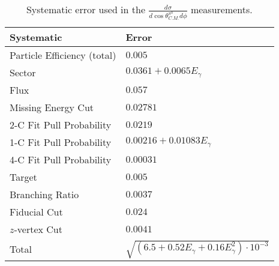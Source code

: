 \begin{table}[h!]
\begin{center}


\caption[Systematics]{\label{tab:systematics}Systematic error used in the $\frac{d\sigma}{d\cos\theta^{\pi^0}_{C.M.} d\phi}$ measurements. \vspace{0.75mm}}

\begin{tabular}{p{5.25cm} | p{5.35cm}}
\hline
Systematic & Error \\
\hline
Particle Efficiency (total) & $0.005$ \\
Sector  & $ 0.0361 + 0.0065E_{\gamma}$ \\
Flux  & $ 0.057$ \\
Missing Energy Cut  & $0.02781$ \\
2-C Fit Pull Probability & $0.0219$ \\
1-C Fit Pull Probability  & $ 0.00216 + 0.01083E_{\gamma}$ \\
4-C Fit Pull Probability  & $0.00031$ \\ 
Target  & $0.005$ \\
Branching Ratio  & $0.0037$ \\
Fiducial Cut & $0.024$ \\
$z$-vertex Cut & $0.0041$ \\
Total & $\sqrt{(6.5 +0.52E_{\gamma} +0.16E_{\gamma}^2)\cdot10^{-3}}$ \\
\hline \hline
\end{tabular}


\end{center}
\end{table}
\vspace{20pt}